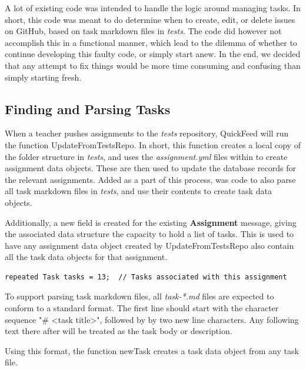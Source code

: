 A lot of existing code was intended to handle the logic around managing tasks. 
In short, this code was meant to do determine when to create, edit, or delete issues on GitHub, based on task markdown files in \textit{tests}.
The code did however not accomplish this in a functional manner, which lead to the dilemma of whether to continue developing this faulty code, or simply start anew.
In the end, we decided that any attempt to fix things would be more time consuming and confusing than simply starting fresh.

\subsection{Finding and Parsing Tasks}
\label{sec:parsing_tasks}

When a teacher pushes assignments to the \textit{tests} repository, QuickFeed will run the function UpdateFromTestsRepo.
In short, this function creates a local copy of the folder structure in \textit{tests}, and uses the \textit{assignment.yml} files within to create assignment data objects.
These are then used to update the database records for the relevant assignments.
Added as a part of this process, was code to also parse all task markdown files in \textit{tests}, and use their contents to create task data objects.

Additionally, a new field is created for the existing \textbf{Assignment} message, giving the associated data structure the capacity to hold a list of tasks.
This is used to have any assignment data object created by UpdateFromTestsRepo also contain all the task data objects for that assignment.
\begin{lstlisting}[caption={Modification to the Assignment message}, numbers=none]
repeated Task tasks = 13;  // Tasks associated with this assignment
\end{lstlisting}

To support parsing task markdown files, all \textit{task-*.md} files are expected to conform to a standard format.
The first line should start with the character sequence "\# <task title>", followed by by two new line characters.
Any following text there after will be treated as the task body or description.

Using this format, the function newTask creates a task data object from any task file.



